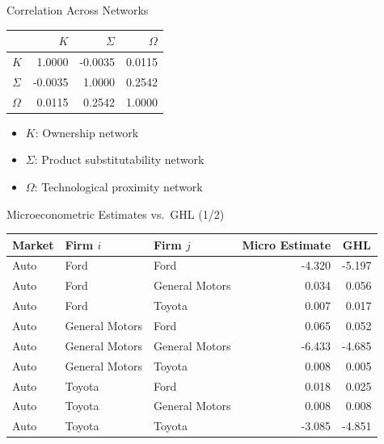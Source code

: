 \documentclass[
  10pt,
  aspectratio=169,   %
]{beamer}
\theoremstyle{plain}
\begin{document}
\begin{frame}{Correlation Across Networks}
  \label{network_correlations}
  \begin{center}
    \begin{tabular}{lrrr}
      \toprule
               & $K$     & $\Sigma$ & $\Omega$ \\
      \midrule
      $K$      & 1.0000  & -0.0035  & 0.0115   \\
      $\Sigma$ & -0.0035 & 1.0000   & 0.2542   \\
      $\Omega$ & 0.0115  & 0.2542   & 1.0000   \\
      \bottomrule
    \end{tabular}
  \end{center}
  \begin{itemize}
    \item $K$: Ownership network
    \item $\Sigma$: Product substitutability network
    \item $\Omega$: Technological proximity network
  \end{itemize}
  \hyperlink{identification_summary}{}
\end{frame}

\begin{frame}[t]{Microeconometric Estimates vs.\ GHL \citep{Pellegrino2024-dn} (1/2)}
  \label{micro_vs_ghl}
  \begin{center}
    \begin{tabular}{lllrr}
      \toprule
      Market & Firm $i$       & Firm $j$       & \multicolumn{1}{c}{Micro Estimate} & \multicolumn{1}{c}{GHL} \\
      \midrule
      Auto   & Ford           & Ford           & -4.320                             & -5.197                  \\
      Auto   & Ford           & General Motors & 0.034                              & 0.056                   \\
      Auto   & Ford           & Toyota         & 0.007                              & 0.017                   \\
      Auto   & General Motors & Ford           & 0.065                              & 0.052                   \\
      Auto   & General Motors & General Motors & -6.433                             & -4.685                  \\
      Auto   & General Motors & Toyota         & 0.008                              & 0.005                   \\
      Auto   & Toyota         & Ford           & 0.018                              & 0.025                   \\
      Auto   & Toyota         & General Motors & 0.008                              & 0.008                   \\
      Auto   & Toyota         & Toyota         & -3.085                             & -4.851                  \\
      \bottomrule
    \end{tabular}
  \end{center}
  \hyperlink{product_identification}{}
\end{frame}
\end{document}
